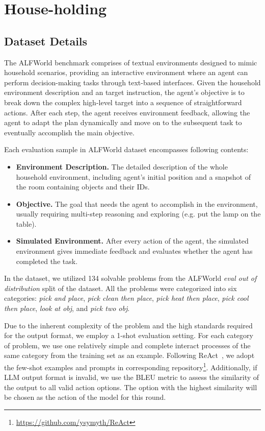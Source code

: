 \section{House-holding} \label{app:hh}
\subsection{Dataset Details}
The ALFWorld benchmark comprises of textual environments designed to mimic household scenarios, providing an interactive environment where an agent can perform decision-making tasks through text-based interfaces. 
Given the household environment description and an target instruction, the agent's objective is to break down the complex high-level target into a sequence of straightforward actions. 
After each step, the agent receives environment feedback, allowing the agent to adapt the plan dynamically and move on to the subsequent task to eventually accomplish the main objective.

Each evaluation sample in ALFWorld dataset encompasses following contents:

\begin{itemize}[leftmargin=1.5em,itemsep=0pt,parsep=0.2em,topsep=0.0em,partopsep=0.0em]
    \item \textbf{Environment Description.} The detailed description of the whole household environment, including agent's initial position and a snapshot of the room containing objects and their IDs.
    \item \textbf{Objective. } The goal that needs the agent to accomplish in the environment, usually requiring multi-step reasoning and exploring (e.g. put the lamp on the table).
    \item \textbf{Simulated Environment. } After every action of the agent, the simulated environment gives immediate feedback and evaluates whether the agent has completed the task.
\end{itemize}

In the dataset, we utilized 134 solvable problems from the ALFWorld \textit{eval out of distribution} split of the dataset. All the problems were categorized into six categories: \textit{pick and place}, \textit{pick clean then place}, \textit{pick heat then place}, \textit{pick cool then place}, \textit{look at obj}, and \textit{pick two obj}.

Due to the inherent complexity of the problem and the high standards required for the output format, we employ a 1-shot evaluation setting. 
For each category of problem, we use one relatively simple and complete interact processes of the same category from the training set as an example. 
Following ReAct~\citep{yao2023react}, we adopt the few-shot examples and prompts in corresponding repository\footnote{\url{https://github.com/ysymyth/ReAct}}. 
Additionally, if LLM output format is invalid, we use the BLEU metric to assess the similarity of the output to all valid action options. The option with the highest similarity will be chosen as the action of the model for this round.

